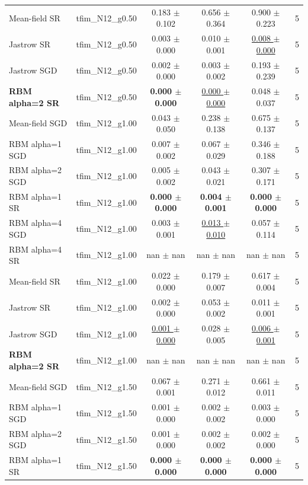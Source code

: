 \begin{tabular}{llcccc}
Mean-field SR & tfim\_N12\_g0.50 & 0.183 $\pm$ 0.102 & 0.656 $\pm$ 0.364 & 0.900 $\pm$ 0.223 & 5 \\
Jastrow SR & tfim\_N12\_g0.50 & 0.003 $\pm$ 0.000 & 0.010 $\pm$ 0.001 & \underline{0.008 $\pm$ 0.000} & 5 \\
Jastrow SGD & tfim\_N12\_g0.50 & 0.002 $\pm$ 0.000 & 0.003 $\pm$ 0.002 & 0.193 $\pm$ 0.239 & 5 \\
\textbf{RBM alpha=2 SR} & tfim\_N12\_g0.50 & \textbf{0.000 $\pm$ 0.000} & \underline{0.000 $\pm$ 0.000} & 0.048 $\pm$ 0.037 & 5 \\
\midrule
Mean-field SGD & tfim\_N12\_g1.00 & 0.043 $\pm$ 0.050 & 0.238 $\pm$ 0.138 & 0.675 $\pm$ 0.137 & 5 \\
RBM alpha=1 SGD & tfim\_N12\_g1.00 & 0.007 $\pm$ 0.002 & 0.067 $\pm$ 0.029 & 0.346 $\pm$ 0.188 & 5 \\
RBM alpha=2 SGD & tfim\_N12\_g1.00 & 0.005 $\pm$ 0.002 & 0.043 $\pm$ 0.021 & 0.307 $\pm$ 0.171 & 5 \\
RBM alpha=1 SR & tfim\_N12\_g1.00 & \textbf{0.000 $\pm$ 0.000} & \textbf{0.004 $\pm$ 0.001} & \textbf{0.000 $\pm$ 0.000} & 5 \\
RBM alpha=4 SGD & tfim\_N12\_g1.00 & 0.003 $\pm$ 0.001 & \underline{0.013 $\pm$ 0.010} & 0.057 $\pm$ 0.114 & 5 \\
RBM alpha=4 SR & tfim\_N12\_g1.00 & nan $\pm$ nan & nan $\pm$ nan & nan $\pm$ nan & 5 \\
Mean-field SR & tfim\_N12\_g1.00 & 0.022 $\pm$ 0.000 & 0.179 $\pm$ 0.007 & 0.617 $\pm$ 0.004 & 5 \\
Jastrow SR & tfim\_N12\_g1.00 & 0.002 $\pm$ 0.000 & 0.053 $\pm$ 0.002 & 0.011 $\pm$ 0.001 & 5 \\
Jastrow SGD & tfim\_N12\_g1.00 & \underline{0.001 $\pm$ 0.000} & 0.028 $\pm$ 0.005 & \underline{0.006 $\pm$ 0.001} & 5 \\
\textbf{RBM alpha=2 SR} & tfim\_N12\_g1.00 & nan $\pm$ nan & nan $\pm$ nan & nan $\pm$ nan & 5 \\
\midrule
Mean-field SGD & tfim\_N12\_g1.50 & 0.067 $\pm$ 0.001 & 0.271 $\pm$ 0.012 & 0.661 $\pm$ 0.011 & 5 \\
RBM alpha=1 SGD & tfim\_N12\_g1.50 & 0.001 $\pm$ 0.000 & 0.002 $\pm$ 0.002 & 0.003 $\pm$ 0.000 & 5 \\
RBM alpha=2 SGD & tfim\_N12\_g1.50 & 0.001 $\pm$ 0.000 & 0.002 $\pm$ 0.002 & 0.002 $\pm$ 0.000 & 5 \\
RBM alpha=1 SR & tfim\_N12\_g1.50 & \textbf{0.000 $\pm$ 0.000} & \textbf{0.000 $\pm$ 0.000} & \textbf{0.000 $\pm$ 0.000} & 5 \\

\end{tabular}
